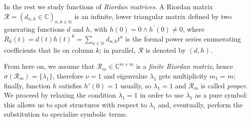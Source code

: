 
In the rest we study functions of \emph{Riordan matrices}. A Riordan matrix
$\mathcal{R}=(d_{n,k}\in\mathbb{C})_{n,k\in\mathbb{N}}$ is an infinite, lower
triangular matrix defined by two generating functions $d$ and $h$, with $h(0)=0
\wedge h^{\prime}(0)\neq0$, where $R_{k}(t) = d(t)h(t)^{k} =
\sum_{n\in\mathbb{N}}{d_{n,k}t^{n}}$ is the formal power series enumerating
coefficients that lie on column $k$; in parallel, $\mathcal{R}$ is denoted by $(d,
h)$. 

From here on, we assume that $\mathcal{R}_{m}\in\mathbb{C}^{m\times m}$ is a
\emph{finite Riordan matrix}, hence $\sigma(\mathcal{R}_{m})= \lbrace
\lambda_{1} \rbrace$, therefore $\nu=1$ and eigenvalue $\lambda_{1}$ gets
multiplicity $m_{1}=m$; finally, function $h$ satisfies $h'(0)=1$ usually, so
$\lambda_{1}=1$ and $\mathcal{R}_{m}$ is called \textit{proper}.
We proceed by relaxing the condition $\lambda_{1}=1$ in order to use
$\lambda_{1}$ as a pure symbol: this allows us to spot structures with respect
to $\lambda_{1}$ and, eventually, perform the substitution to specialize
symbolic terms.

